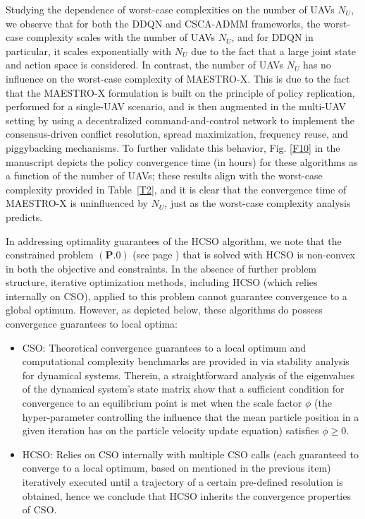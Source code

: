 \documentclass[12pt, draftcls, onecolumn]{IEEEtran}
\theoremstyle{plain}
\theoremstyle{definition}
\theoremstyle{remark}
\begin{document}
\begin{enumerate}
Studying the dependence of worst-case complexities on the number of UAVs $N_U$, we observe that for both the DDQN \cite{DDQN} and CSCA-ADMM \cite{CSCA-ADMM} frameworks, the worst-case complexity scales with the number of UAVs $N_U$, and for DDQN in particular, it scales exponentially with $N_U$ due to the fact that a large joint state and action space is considered. In contrast, the number of UAVs $N_U$ has no influence on the worst-case complexity of MAESTRO-X. This is due to the fact that the MAESTRO-X formulation is built on the principle of policy replication, performed for a single-UAV scenario, and is then augmented in the multi-UAV setting by using a decentralized command-and-control network to implement the consensus-driven conflict resolution, spread maximization, frequency reuse, and piggybacking mechanisms. To further validate this behavior, Fig. \ref{F10} in the manuscript depicts the policy convergence time (in hours) for these algorithms as a function of the number of UAVs; these results align with the worst-case complexity provided in Table~\ref{T2}, and it is clear that the convergence time of MAESTRO-X is uninfluenced by $N_U$, just as the worst-case complexity analysis predicts.
\vspace{2mm}

In addressing optimality guarantees of the HCSO algorithm, we note that the constrained problem $(\mathbf{P.0})$ (see page \pageref{eq:HeurMin}) that is solved with HCSO is non-convex in both the objective and constraints. In the absence of further problem structure, iterative optimization methods, including HCSO (which relies internally on CSO), applied to this problem cannot guarantee convergence to a global optimum. However, as depicted below, these algorithms do possess convergence guarantees to local optima:
\begin{itemize}
    \item CSO: Theoretical convergence guarantees to a local optimum and computational complexity benchmarks are provided in \cite{CSO} via stability analysis for dynamical systems. Therein, a straightforward analysis of the eigenvalues of the dynamical system's state matrix show that a sufficient condition for convergence to an equilibrium point is met when the scale factor $\phi$ (the hyper-parameter controlling the influence that the mean particle position in a given iteration has on the particle velocity update equation) satisfies $\phi{\geq}0$.
    \item HCSO: Relies on CSO internally with multiple CSO calls (each guaranteed to converge to a local optimum, based on \cite{CSO} mentioned in the previous item) iteratively executed until a trajectory of a certain pre-defined resolution is obtained, hence we conclude that HCSO inherits the convergence properties of CSO.
\end{itemize}
\vspace{2mm}


\end{enumerate}
\end{document}

